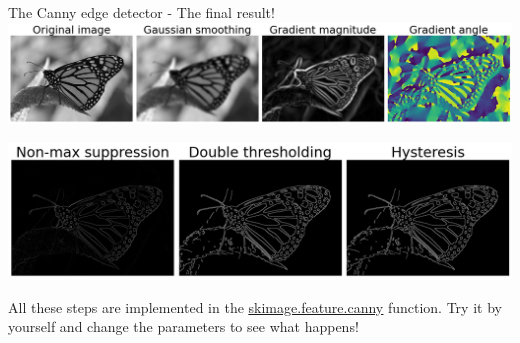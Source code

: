 \documentclass[9pt, aspectratio=169]{beamer}
\begin{document}
\begin{frame}
{The Canny edge detector - The final result!}
\centering
\includegraphics[width=\textwidth]{canny_step1-2.png}

\includegraphics[width=.75\textwidth]{canny_step3-5.png}

All these steps are implemented in the \href{https://scikit-image.org/docs/dev/api/skimage.feature.html\#skimage.feature.canny}{\underline{skimage.feature.canny}} function.
Try it by yourself and change the parameters to see what happens!
\end{frame}
\end{document}
